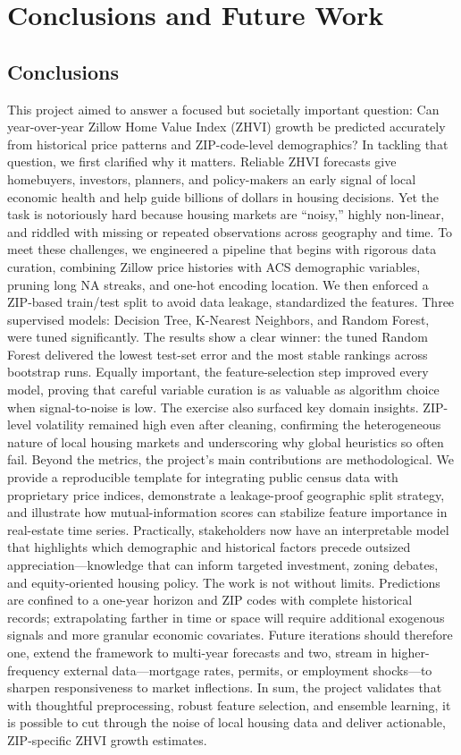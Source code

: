 \chapter{Conclusions and Future Work}
\label{ch:con}
\section{Conclusions}
This project aimed to answer a focused but societally important question: Can year-over-year Zillow Home Value Index (ZHVI) growth be predicted accurately from historical price patterns and ZIP-code-level demographics? In tackling that question, we first clarified why it matters. Reliable ZHVI forecasts give homebuyers, investors, planners, and policy-makers an early signal of local economic health and help guide billions of dollars in housing decisions. Yet the task is notoriously hard because housing markets are “noisy,” highly non-linear, and riddled with missing or repeated observations across geography and time. To meet these challenges, we engineered a pipeline that begins with rigorous data curation, combining Zillow price histories with ACS demographic variables, pruning long NA streaks, and one-hot encoding location. We then enforced a ZIP-based train/test split to avoid data leakage, standardized the features. Three supervised models: Decision Tree, K-Nearest Neighbors, and Random Forest, were tuned significantly. The results show a clear winner: the tuned Random Forest delivered the lowest test-set error and the most stable rankings across bootstrap runs. Equally important, the feature-selection step improved every model, proving that careful variable curation is as valuable as algorithm choice when signal-to-noise is low. The exercise also surfaced key domain insights. ZIP-level volatility remained high even after cleaning, confirming the heterogeneous nature of local housing markets and underscoring why global heuristics so often fail. Beyond the metrics, the project’s main contributions are methodological. We provide a reproducible template for integrating public census data with proprietary price indices, demonstrate a leakage-proof geographic split strategy, and illustrate how mutual-information scores can stabilize feature importance in real-estate time series. Practically, stakeholders now have an interpretable model that highlights which demographic and historical factors precede outsized appreciation—knowledge that can inform targeted investment, zoning debates, and equity-oriented housing policy. The work is not without limits. Predictions are confined to a one-year horizon and ZIP codes with complete historical records; extrapolating farther in time or space will require additional exogenous signals and more granular economic covariates. Future iterations should therefore one, extend the framework to multi-year forecasts and two, stream in higher-frequency external data—mortgage rates, permits, or employment shocks—to sharpen responsiveness to market inflections. In sum, the project validates that with thoughtful preprocessing, robust feature selection, and ensemble learning, it is possible to cut through the noise of local housing data and deliver actionable, ZIP-specific ZHVI growth estimates.

